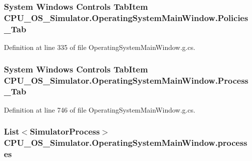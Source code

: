\subsubsection[{Policies\+\_\+\+Tab}]{\setlength{\rightskip}{0pt plus 5cm}System Windows Controls Tab\+Item C\+P\+U\+\_\+\+O\+S\+\_\+\+Simulator.\+Operating\+System\+Main\+Window.\+Policies\+\_\+\+Tab\hspace{0.3cm}{\ttfamily [package]}}\label{class_c_p_u___o_s___simulator_1_1_operating_system_main_window_a019542a100cb475965f111d94085a16a}


Definition at line 335 of file Operating\+System\+Main\+Window.\+g.\+cs.

\hypertarget{class_c_p_u___o_s___simulator_1_1_operating_system_main_window_a01c2d1944c9470e56e5bbbcdff683f2b}{}
\subsubsection[{Process\+\_\+\+Tab}]{\setlength{\rightskip}{0pt plus 5cm}System Windows Controls Tab\+Item C\+P\+U\+\_\+\+O\+S\+\_\+\+Simulator.\+Operating\+System\+Main\+Window.\+Process\+\_\+\+Tab\hspace{0.3cm}{\ttfamily [package]}}\label{class_c_p_u___o_s___simulator_1_1_operating_system_main_window_a01c2d1944c9470e56e5bbbcdff683f2b}


Definition at line 746 of file Operating\+System\+Main\+Window.\+g.\+cs.

\hypertarget{class_c_p_u___o_s___simulator_1_1_operating_system_main_window_ab6bcbc8c33ec438d2f005d4c978e1a44}{}
\subsubsection[{processes}]{\setlength{\rightskip}{0pt plus 5cm}List$<${\bf Simulator\+Process}$>$ C\+P\+U\+\_\+\+O\+S\+\_\+\+Simulator.\+Operating\+System\+Main\+Window.\+processes\hspace{0.3cm}{\ttfamily [private]}}\label{class_c_p_u___o_s___simulator_1_1_operating_system_main_window_ab6bcbc8c33ec438d2f005d4c978e1a44}


